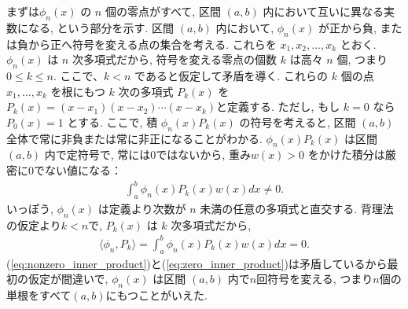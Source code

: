 \documentclass{ltjsarticle}
\theoremstyle{definition}
\begin{document}
まずは$\phi_n(x)$ の $n$ 個の零点がすべて, 区間 $(a, b)$ 内において互いに異なる実数になる, という部分を示す. 区間 $(a, b)$ 内において, $\phi_n(x)$ が正から負, または負から正へ符号を変える点の集合を考える. これらを $x_1, x_2, \dots, x_k$ とおく. $\phi_n(x)$ は $n$ 次多項式だから, 符号を変える零点の個数 $k$ は高々 $n$ 個, つまり$0 \le k \le n$. ここで、$k < n$ であると仮定して矛盾を導く. これらの $k$ 個の点 $x_1, \dots, x_k$ を根にもつ $k$ 次の多項式 $P_k(x)$ を$P_k(x) = (x - x_1)(x - x_2) \cdots (x - x_k)$と定義する. ただし, もし $k=0$ なら $P_0(x) = 1$ とする. ここで, 積 $\phi_n(x) P_k(x)$ の符号を考えると, 区間 $(a, b)$ 全体で常に非負または常に非正になることがわかる. $\phi_n(x) P_k(x)$ は区間 $(a, b)$ 内で定符号で, 常には0ではないから, 重み$w(x) > 0$ をかけた積分は厳密に0でない値になる：
\begin{align}
  \int_a^b \phi_n(x) P_k(x) w(x) dx \neq 0.\label{eq:nonzero_inner_product}
\end{align}
いっぽう, $\phi_n(x)$ は定義より次数が $n$ 未満の任意の多項式と直交する. 背理法の仮定より$k<n$で, $P_k(x)$ は $k$ 次多項式だから, 
\begin{align}
  \langle \phi_n, P_k \rangle = \int_a^b \phi_n(x) P_k(x) w(x) dx = 0.\label{eq:zero_inner_product}
\end{align}
(\ref{eq:nonzero_inner_product})と(\ref{eq:zero_inner_product})は矛盾しているから最初の仮定が間違いで, $\phi_n(x)$ は区間 $(a, b)$ 内で$n$回符号を変える, つまり$n$個の単根をすべて$(a, b)$にもつことがいえた.
\end{document}

